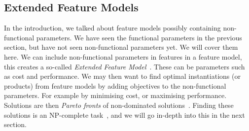 \subsection{Extended Feature Models}\label{sec:extendedfeaturemodels}
In the introduction, we talked about feature models possibly containing 
non-functional parameters. We have seen the functional parameters in the
previous section, but have not seen non-functional parameters yet. We will
cover them here. We can include non-functional parameters in features in a
feature model, this creates a so-called
\emph{Extended Feature Model}~\cite{benavides2005extfms}. These can be
parameters such as cost and performance. We may then want to find optimal
instantiations (or products) from feature models by adding objectives to
the non-functional parameters. For example by minimising cost, or maximising
performance. Solutions are then \emph{Pareto fronts} of non-dominated
solutions~\cite{horcas2022breakit}. Finding these solutions is an NP-complete
task~\cite{ochoa2018npcomplete}, and we will go in-depth into this in the next
section.
